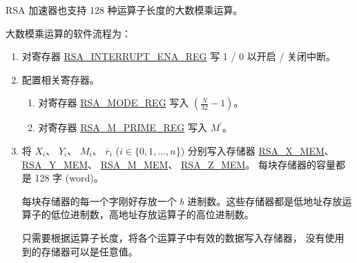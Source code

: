 \documentclass[main\_\_CN.tex]{subfiles}
\begin{document}
RSA 加速器也支持 128 种运算子长度的大数模乘运算。

大数模乘运算的软件流程为：

\begin{enumerate}

    \item 对寄存器 \hyperref[regdesc:RSAINTERRUPTENAREG]{RSA\_INTERRUPT\_ENA\_REG} 写 1 / 0 以开启 / 关闭中断。

    \item 配置相关寄存器。

    \begin{enumerate}
        \item 对寄存器 \hyperref[regdesc:RSAMODEREG]{RSA\_MODE\_REG} 写入 \begin{math}( \frac{N}{32} - 1 )\end{math}。

        \item 对寄存器 \hyperref[regdesc:RSAMPRIMEREG]{RSA\_M\_PRIME\_REG} 写入 \begin{math}M^{\prime}\end{math}。

    \end{enumerate}

    \item 将
        \begin{math}X_{i}\end{math}、
        \begin{math}Y_{i}\end{math}、
        \begin{math}M_{i}\end{math}、
        \begin{math}\overline{r}_{i}\end{math}
        (\begin{math}i \in \{0, 1, \dots, n\end{math}\})
        分别写入存储器
        \hyperref[regdesc:RSAmemory]{RSA\_X\_MEM}、
        \hyperref[regdesc:RSAmemory]{RSA\_Y\_MEM}、
        \hyperref[regdesc:RSAmemory]{RSA\_M\_MEM}、
        \hyperref[regdesc:RSAmemory]{RSA\_Z\_MEM}。
        每块存储器的容量都是 128 字 (word)。

        每块存储器的每一个字刚好存放一个 \begin{math}b\end{math} 进制数。这些存储器都是低地址存放运算子的低位进制数，高地址存放运算子的高位进制数。

        只需要根据运算子长度，将各个运算子中有效的数据写入存储器，
        没有使用到的存储器可以是任意值。


\end{enumerate}
\end{document}
